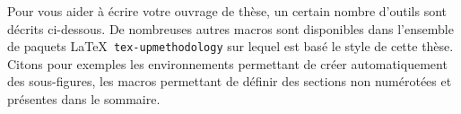 \documentclass[french]{spimutbmphdthesis}
\begin{document}
%
%
%
%
%
%

\chapterintro

Pour vous aider à écrire votre ouvrage de thèse, un certain nombre d'outils sont décrits ci-dessous.
De nombreuses autres macros sont disponibles dans l'ensemble de paquets \LaTeX\ \texttt{tex-upmethodology}
sur lequel est basé le style de cette thèse. Citons pour exemples les environnements permettant de créer
automatiquement des sous-figures, les macros permettant de définir des sections non numérotées et présentes
dans le sommaire.
\end{document}
